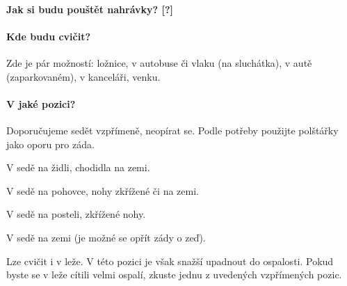 		\paragraph{Jak si budu pouštět nahrávky? [?]} 
		\paragraph{Kde budu cvičit?} \par Zde je pár možností: ložnice, v autobuse či vlaku (na sluchátka), v autě (zaparkovaném), v kanceláři, venku.
		\paragraph{V jaké pozici?}  \par Doporučujeme sedět vzpřímeně, neopírat se. Podle potřeby použijte polštářky jako oporu pro záda.
			\begin{enumerate*}
				\item V sedě na židli, chodidla na zemi.
				\item V sedě na pohovce, nohy zkřížené či na zemi.
				\item V sedě na posteli, zkřížené nohy.
				\item V sedě na zemi (je možné se opřít zády o zeď).
			\end{enumerate*}
			Lze cvičit i v leže. V této pozici je však snažší upadnout do ospalosti. Pokud byste se v leže cítili velmi ospalí, zkuste jednu z uvedených vzpřímených pozic.
	\clearpage
